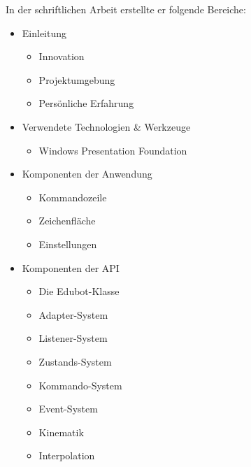 \begin{itemize}
In der schriftlichen Arbeit erstellte er folgende Bereiche:
\begin{itemize}
\item Einleitung
\begin{itemize}
\item Innovation
\item Projektumgebung
\item Persönliche Erfahrung
\end{itemize}
\item Verwendete Technologien \& Werkzeuge
\begin{itemize}
\item Windows Presentation Foundation
\end{itemize}
\item Komponenten der Anwendung
\begin{itemize}
\item Kommandozeile
\item Zeichenfläche
\item Einstellungen
\end{itemize}
\item Komponenten der API
\begin{itemize}
\item Die Edubot-Klasse
\item Adapter-System
\item Listener-System
\item Zustands-System
\item Kommando-System
\item Event-System
\item Kinematik
\item Interpolation
\end{itemize}
\end{itemize}
     

\end{itemize}
